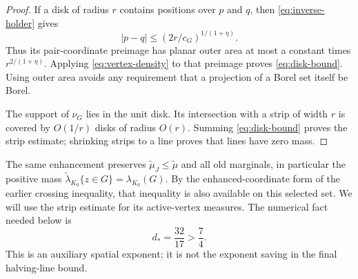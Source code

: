 \begin{proof}
If a disk of radius $r$ contains positions over $p$ and $q$, then
\eqref{eq:inverse-holder} gives
\[
 |p-q|\le (2r/c_G)^{1/(1+\eta)}.
\]
Thus its pair-coordinate preimage has planar outer area at most a
constant times $r^{2/(1+\eta)}$.  Applying
\eqref{eq:vertex-density} to that preimage proves
\eqref{eq:disk-bound}.  Using outer area avoids any requirement that a
projection of a Borel set itself be Borel.

The support of $\nu_G$ lies in the unit disk.  Its intersection with a
strip of width $r$ is covered by $O(1/r)$ disks of radius $O(r)$.
Summing \eqref{eq:disk-bound} proves the strip estimate; shrinking strips
to a line proves that lines have zero mass.
\end{proof}

The same enhancement preserves $\widetilde\mu_J\le\widetilde\mu$ and
all old marginals, in particular the positive mass
$\widetilde\lambda_{K_0}\{z\in G\}=\lambda_{K_0}(G)$.
By the enhanced-coordinate form of the earlier crossing inequality,
that inequality is also available on this selected set.  We will use the strip estimate
for its active-vertex measures.  The numerical fact needed below is
\[
 d_*=\frac{32}{17}>\frac74.
\]
This is an auxiliary spatial exponent; it is not the exponent saving in
the final halving-line bound.
